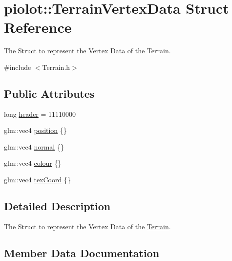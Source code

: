 \hypertarget{structpiolot_1_1_terrain_vertex_data}{}\section{piolot\+:\+:Terrain\+Vertex\+Data Struct Reference}
\label{structpiolot_1_1_terrain_vertex_data}


The Struct to represent the Vertex Data of the \mbox{\hyperlink{classpiolot_1_1_terrain}{Terrain}}.  




{\ttfamily \#include $<$Terrain.\+h$>$}

\subsection*{Public Attributes}
\begin{DoxyCompactItemize}
\item 
long \mbox{\hyperlink{structpiolot_1_1_terrain_vertex_data_a559af60322d3c21a596918395b0797b5}{header}} = 11110000
\item 
glm\+::vec4 \mbox{\hyperlink{structpiolot_1_1_terrain_vertex_data_a34dd37f5d46ecffd9fc814756ce157f2}{position}} \{\}
\item 
glm\+::vec4 \mbox{\hyperlink{structpiolot_1_1_terrain_vertex_data_a3df9c91e8e95f6ef387407d6ad63e58f}{normal}} \{\}
\item 
glm\+::vec4 \mbox{\hyperlink{structpiolot_1_1_terrain_vertex_data_a6fc3504463d54667d8437fa48cee7b8a}{colour}} \{\}
\item 
glm\+::vec4 \mbox{\hyperlink{structpiolot_1_1_terrain_vertex_data_a835ff63fc4638b1a21c4037e4866a126}{tex\+Coord}} \{\}
\end{DoxyCompactItemize}


\subsection{Detailed Description}
The Struct to represent the Vertex Data of the \mbox{\hyperlink{classpiolot_1_1_terrain}{Terrain}}. 

\subsection{Member Data Documentation}
\mbox{\label{structpiolot_1_1_terrain_vertex_data_a6fc3504463d54667d8437fa48cee7b8a}} 
